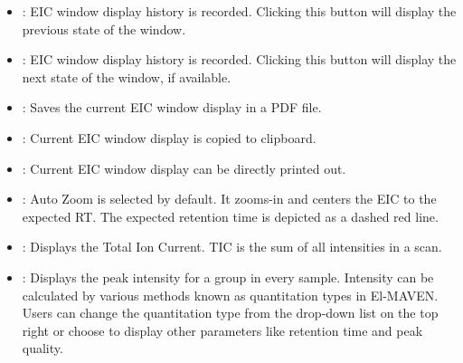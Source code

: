 \documentclass[letterpaper,10pt,english,openany,oneside]{sphinxmanual}
\begin{document}
\begin{itemize}
\item {} 
 : EIC window display history is recorded. Clicking this button will display the previous state of the window.

\item {} 
 : EIC window display history is recorded. Clicking this button will display the next state of the window, if available.

\item {} 
 : Saves the current EIC window display in a PDF file.

\item {} 
 : Current EIC window display is copied to clipboard.

\item {} 
 : Current EIC window display can be directly printed out.

\item {} 
 : Auto Zoom is selected by default. It zooms-in and centers the EIC to the expected RT. The expected retention time is depicted as a dashed red line.

\end{itemize}

\begin{itemize}
\item {} 
 : Displays the Total Ion Current. TIC is the sum of all intensities in a scan.

\item {} 
 : Displays the peak intensity for a group in every sample. Intensity can be calculated by various methods known as quantitation types in El-MAVEN. Users can change the quantitation type from the drop-down list on the top right or choose to display other parameters like retention time and peak quality.

\end{itemize}
\end{document}
